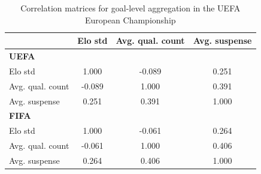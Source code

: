 \begin{table}[H]
\centering
\small
\caption{Correlation matrices for goal-level aggregation in the UEFA European Championship}
\label{tab:corr_eu}
\begin{tabular}{lccc}
\toprule
 & Elo std & Avg. qual. count & Avg. suspense \\
\midrule
\multicolumn{4}{l}{\textbf{UEFA}} \\
Elo std             & 1.000 & -0.089 & 0.251 \\
Avg. qual. count    & -0.089 & 1.000 & 0.391 \\
Avg. suspense       & 0.251 & 0.391 & 1.000 \\
\midrule
\multicolumn{4}{l}{\textbf{FIFA}} \\
Elo std             & 1.000 & -0.061 & 0.264 \\
Avg. qual. count    & -0.061 & 1.000 & 0.406 \\
Avg. suspense       & 0.264 & 0.406 & 1.000 \\
\bottomrule
\end{tabular}
\end{table}
